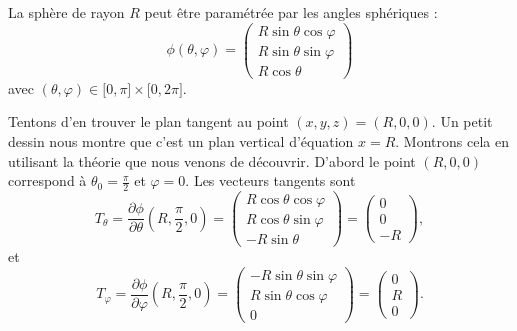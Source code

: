 \begin{example}
    La sphère de rayon $R$ peut être paramétrée par les angles sphériques :
    \begin{equation}
        \phi(\theta,\varphi)=\begin{pmatrix}
            R\sin\theta\cos\varphi    \\
            R\sin\theta\sin\varphi    \\
            R\cos\theta
        \end{pmatrix}
    \end{equation}
    avec $(\theta,\varphi)\in\mathopen[ 0 , \pi \mathclose]\times \mathopen[ 0 , 2\pi \mathclose]$.

    Tentons d'en trouver le plan tangent au point $(x,y,z)=(R,0,0)$. Un petit dessin nous montre que c'est un plan vertical d'équation $x=R$. Montrons cela en utilisant la théorie que nous venons de découvrir. D'abord le point $(R,0,0)$ correspond à $\theta_0=\frac{ \pi }{ 2 }$ et $\varphi=0$. Les vecteurs tangents sont
    \begin{equation}        \label{EqTthetaSph}
        T_{\theta}=\frac{ \partial \phi }{ \partial \theta }(R,\frac{ \pi }{2},0)=\begin{pmatrix}
            R\cos\theta\cos\varphi    \\
            R\cos\theta\sin\varphi    \\
            -R\sin\theta
        \end{pmatrix}=\begin{pmatrix}
            0    \\
            0    \\
            -R
        \end{pmatrix},
    \end{equation}
    et
    \begin{equation}    \label{EqTvarphiSph}
        T_{\varphi}=\frac{ \partial \phi }{ \partial \varphi }(R,\frac{ \pi }{2},0)=\begin{pmatrix}
            -R\sin\theta\sin\varphi\\
            R\sin\theta\cos\varphi\\
            0
        \end{pmatrix}=\begin{pmatrix}
            0    \\
            R    \\
            0
        \end{pmatrix}.
    \end{equation}

\end{example}
